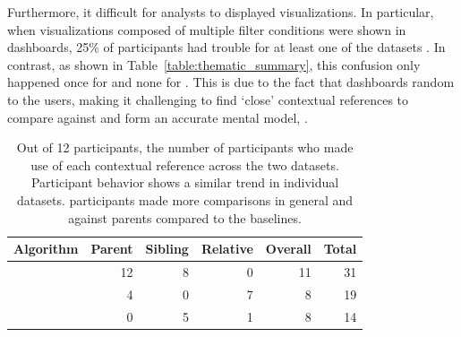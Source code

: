 \par Furthermore,  it difficult for analysts to  displayed visualizations. In particular, when visualizations composed of multiple filter conditions were shown in \cluster dashboards, 25\% of participants had trouble  for at least one of the datasets . In contrast, as shown in Table~\ref{table:thematic_summary}, this confusion only happened once for \BFS and none for \system. This is due to the fact that \cluster dashboards  random to the users, making it challenging to find `close' contextual references to compare against and form an accurate mental model, . %
\begin{table}[h!]
\hspace{-10pt}
\centering
	\begin{tabular}{|l|rrrr|r|}
	\hline
	 \small{Algorithm}   &    \small{Parent} &   \small{Sibling} &   \small{Relative} & \small{Overall} &   \small{Total} \\
	\hline
	 \small{\system}     &    \cellcolor{blue!25} 12 &       8 &     0 &  11 &      \cellcolor{blue!25} 31 \\
	 \small{\cluster}     &         4 &        0 &         7 &          8 &      19 \\
	 \small{\BFS}         &         0 &        5 &         1 &          8 &      14 \\
	\hline
	\end{tabular}
\caption{Out of 12 participants, the number of participants who made use of each contextual reference across the two datasets. Participant behavior shows a similar trend in individual datasets. \system participants made more comparisons in general and against parents compared to the baselines.}
\label{table:contextualReferenceCount}
\end{table}
